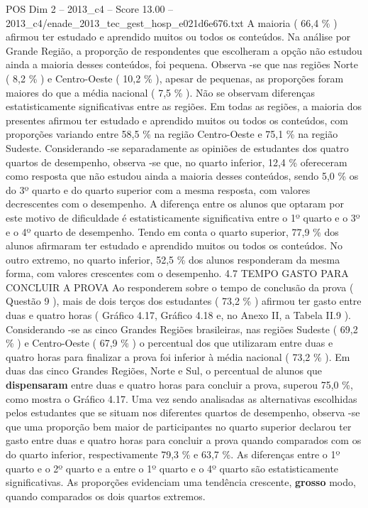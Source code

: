 \begin{textsample}{POS Dim 2 – 2013\_c4 – Score 13.00 – 2013\_c4/enade\_2013\_tec\_gest\_hosp\_e021d6e676.txt}
A maioria ( 66,4 \% ) afirmou ter estudado e aprendido muitos ou todos os conteúdos.
Na análise por Grande Região, a proporção de respondentes que escolheram a opção não estudou ainda a maioria desses conteúdos, foi pequena.
Observa -se que nas regiões Norte ( 8,2 \% ) e Centro-Oeste ( 10,2 \% ), apesar de pequenas, as proporções foram maiores do que a média nacional ( 7,5 \% ).
Não se observam diferenças estatisticamente significativas entre as regiões.
Em todas as regiões, a maioria dos presentes afirmou ter estudado e aprendido muitos ou todos os conteúdos, com proporções variando entre 58,5 \% na região Centro-Oeste e 75,1 \% na região Sudeste.
Considerando -se separadamente as opiniões de estudantes dos quatro quartos de desempenho, observa -se que, no quarto inferior, 12,4 \% ofereceram como resposta que não estudou ainda a maioria desses conteúdos, sendo 5,0 \% os do 3º quarto e do quarto superior com a mesma resposta, com valores decrescentes com o desempenho.
A diferença entre os alunos que optaram por este motivo de dificuldade é estatisticamente significativa entre o 1º quarto e o 3º e o 4º quarto de desempenho.
Tendo em conta o quarto superior, 77,9 \% dos alunos afirmaram ter estudado e aprendido muitos ou todos os conteúdos.
No outro extremo, no quarto inferior, 52,5 \% dos alunos responderam da mesma forma, com valores crescentes com o desempenho. 4.7 TEMPO GASTO PARA CONCLUIR A PROVA Ao responderem sobre o tempo de conclusão da prova ( Questão 9 ), mais de dois terços dos estudantes ( 73,2 \% ) afirmou ter gasto entre duas e quatro horas ( Gráfico 4.17, Gráfico 4.18 e, no Anexo II, a Tabela II.9 ).
Considerando -se as cinco Grandes Regiões brasileiras, nas regiões Sudeste ( 69,2 \% ) e Centro-Oeste ( 67,9 \% ) o percentual dos que utilizaram entre duas e quatro horas para finalizar a prova foi inferior à média nacional ( 73,2 \% ).
Em duas das cinco Grandes Regiões, Norte e Sul, o percentual de alunos que \textbf{dispensaram} entre duas e quatro horas para concluir a prova, superou 75,0 \%, como mostra o Gráfico 4.17.
Uma vez sendo analisadas as alternativas escolhidas pelos estudantes que se situam nos diferentes quartos de desempenho, observa -se que uma proporção bem maior de participantes no quarto superior declarou ter gasto entre duas e quatro horas para concluir a prova quando comparados com os do quarto inferior, respectivamente 79,3 \% e 63,7 \%.
As diferenças entre o 1º quarto e o 2º quarto e a entre o 1º quarto e o 4º quarto são estatisticamente significativas.
As proporções evidenciam uma tendência crescente, \textbf{grosso} modo, quando comparados os dois quartos extremos.

\end{textsample}
